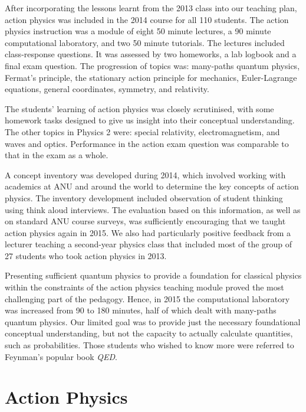 \documentclass[prb,oncolumn]{revtex4-2}
\begin{document}
After incorporating the lessons learnt from the 2013 class into our teaching plan, action physics was included in the 2014 course for all 110 students. The action physics instruction was a module of eight 50 minute lectures, a 90 minute computational laboratory, and two 50 minute tutorials. The lectures included class-response questions.  It was assessed by two homeworks, a lab logbook and a final exam question. The progression of topics was: many-paths quantum physics, Fermat's principle, the stationary action principle for mechanics, Euler-Lagrange equations, general coordinates, symmetry, and relativity.

The students' learning of action physics was closely scrutinised, with some homework tasks designed to give us insight into their conceptual understanding.  The other topics in Physics 2 were: special relativity, electromagnetism, and waves and optics. Performance in the action exam question was comparable to that in the exam as a whole.

A concept inventory was developed during 2014, which involved working with academics at ANU and around the world to determine the key concepts of action physics. \cite{McGinness} The inventory development included observation of student thinking using think aloud interviews. \cite{Adams} The evaluation based on this information, as well as on standard ANU course surveys, was sufficiently encouraging that we taught action physics again in 2015. We also had  particularly positive feedback from a lecturer teaching a second-year physics class that included most of the group of 27 students who took action physics in 2013.

Presenting sufficient quantum physics to provide a foundation for classical physics within the constraints of the action physics teaching module proved the most challenging part of the pedagogy. Hence, in 2015 the computational laboratory was increased from 90 to 180 minutes, half of which dealt with many-paths quantum physics. Our limited goal was to provide just the necessary foundational conceptual understanding, but not the capacity to actually calculate quantities, such as probabilities. Those students who wished to know more were referred to Feynman's popular book \textit{QED}.  \cite{QED}


\section{Action Physics}
\label{Action Physics}
\end{document}
